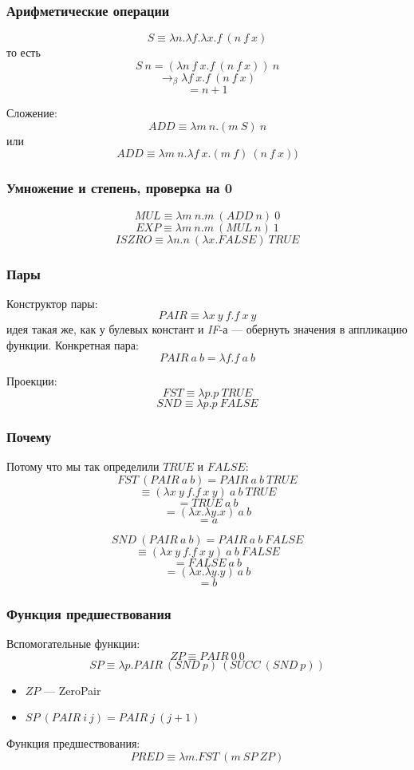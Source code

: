 \documentclass[xetex,mathserif,serif]{beamer}
\begin{document}
    \begin{frame}
        \frametitle{Арифметические операции}
        $$S \equiv \lambda n.\lambda f.\lambda x.f\ (n\ f\ x)$$
        то есть
        $$S\ n = (\lambda n\ f\ x.f\ (n\ f\ x))\ n$$
        $$\rightarrow_\beta \lambda f\ x.f\ (n\ f\ x)$$
        $$= n + 1$$
        
        Сложение:
        $$ADD \equiv \lambda m\ n.(m\ S)\ n$$
        или
        $$ADD \equiv \lambda m\ n.\lambda f\ x.(m\ f)\ (n\ f\ x))$$
    \end{frame}

    \begin{frame}
        \frametitle{Умножение и степень, проверка на 0}
        $$MUL \equiv \lambda m\ n.m\ (ADD\ n)\ 0$$
        $$EXP \equiv \lambda m\ n.m\ (MUL\ n)\ 1$$
        $$ISZRO \equiv \lambda n.n\ (\lambda x.FALSE)\ TRUE$$
    \end{frame}

    \begin{frame}
        \frametitle{Пары}
        Конструктор пары:
        $$PAIR \equiv \lambda x\ y\ f.f\ x\ y$$
        идея такая же, как у булевых констант и \textit{IF}-а --- обернуть значения в аппликацию функции. Конкретная пара:
        $$PAIR\ a\ b = \lambda f.f\ a\ b$$
        
        Проекции:
        $$FST \equiv \lambda p.p\ TRUE$$
        $$SND \equiv \lambda p.p\ FALSE$$
    \end{frame}

    \begin{frame}
        \frametitle{Почему}
        Потому что мы так определили $TRUE$ и $FALSE$:
        $$FST\ (PAIR\ a\ b) = PAIR\ a\ b\ TRUE$$
        $$\equiv (\lambda x\ y\ f.f\ x\ y)\ a\ b\ TRUE$$
        $$= TRUE\ a\ b$$
        $$= (\lambda x.\lambda y.x)\ a\ b$$
        $$= a$$

        $$SND\ (PAIR\ a\ b) = PAIR\ a\ b\ FALSE$$
        $$\equiv (\lambda x\ y\ f.f\ x\ y)\ a\ b\ FALSE$$
        $$= FALSE\ a\ b$$
        $$= (\lambda x.\lambda y.y)\ a\ b$$
        $$= b$$
    \end{frame}

    \begin{frame}
        \frametitle{Функция предшествования}
        Вспомогательные функции:
        $$ZP \equiv PAIR\ 0\ 0$$
        $$SP \equiv \lambda p.PAIR\ (SND\ p)\ (SUCC\ (SND\ p))$$
        \begin{itemize}
            \item $ZP$ --- ZeroPair
            \item $SP\ (PAIR\ i\ j) = PAIR\ j\ (j + 1)$
        \end{itemize}

        \vspace{3mm}

        Функция предшествования:
        $$PRED \equiv \lambda m.FST\ (m\ SP\ ZP)$$
    \end{frame}
\end{document}
